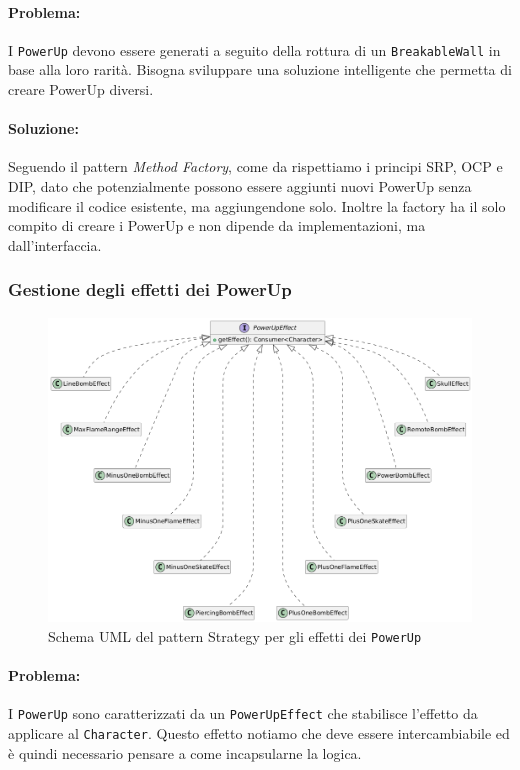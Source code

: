 \documentclass[a4paper,12pt]{report}
\begin{document}
\paragraph{Problema:} I \texttt{PowerUp} devono essere generati a seguito della rottura di un \texttt{BreakableWall} in base alla loro rarità. Bisogna sviluppare una soluzione intelligente che permetta di creare PowerUp diversi.
\paragraph{Soluzione:} Seguendo il pattern \textit{Method Factory}, come da
 rispettiamo i principi SRP, OCP e DIP, dato che potenzialmente possono essere aggiunti nuovi PowerUp senza modificare il codice esistente, ma aggiungendone solo. Inoltre la factory ha il solo compito di creare i PowerUp e non dipende da implementazioni, ma dall'interfaccia.

\subsubsection{Gestione degli effetti dei PowerUp}
\begin{figure}[H]
\centering{}
\includegraphics[width=1.0\columnwidth]{img/power-up-effect-strategy-uml.png}
\caption{Schema UML del pattern Strategy per gli effetti dei \texttt{PowerUp}}
\label{img:uml-power-up-effect-strategy}
\end{figure}
\paragraph{Problema:} I \texttt{PowerUp} sono caratterizzati da un \texttt{PowerUpEffect} che stabilisce l'effetto da applicare al \texttt{Character}. Questo effetto notiamo che deve essere intercambiabile ed è quindi necessario pensare a come incapsularne la logica.
\end{document}
